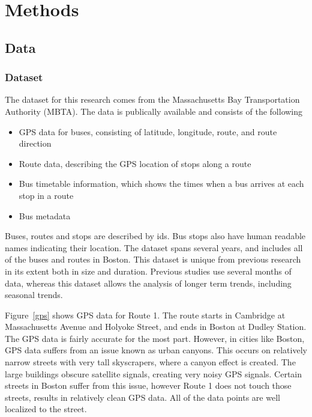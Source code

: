 \chapter{Methods}
\section{Data}\label{data}

\subsection{Dataset}

The dataset for this research comes from the Massachusetts Bay Transportation Authority (MBTA).  The data is publically available and consists of the following

\begin{itemize}
  \item GPS data for buses, consisting of latitude, longitude, route, and route direction
  \item Route data, describing the GPS location of stops along a route
  \item Bus timetable information, which shows the times when a bus arrives at each stop in a route
  \item Bus metadata
\end{itemize}

Buses, routes and stops are described by ids.  Bus stops also have human readable names indicating their location.
The dataset spans several years, and includes all of the buses and routes in Boston.
This dataset is unique from previous research in its extent both in size and duration.
Previous studies use several months of data, whereas this dataset allows the analysis of longer term trends, including seasonal trends.

Figure~\ref{gps} shows GPS data for Route 1.  The route starts in Cambridge at Massachusetts Avenue and Holyoke Street, and ends in Boston at Dudley Station.
The GPS data is fairly accurate for the most part.
However, in cities like Boston, GPS data suffers from an issue known as urban canyons.
This occurs on relatively narrow streets with very tall skyscrapers, where a canyon effect is created.
The large buildings obscure satellite signals, creating very noisy GPS signals.
Certain streets in Boston suffer from this issue, however Route 1 does not touch those streets, results in relatively clean GPS data.
All of the data points are well localized to the street.

